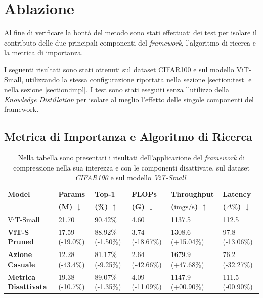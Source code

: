 \section{Ablazione}
Al fine di verificare la bontà del metodo sono stati effettuati dei test per
isolare il contributo delle due principali componenti del \textit{framework},
l'algoritmo di ricerca e la metrica di importanza. \par
I seguenti risultati sono stati ottenuti sul dataset CIFAR100 e sul modello
ViT-Small, utilizzando la stessa configurazione riportata nella sezione
\ref{section:test} e nella sezione \ref{section:impl}. I test sono stati
eseguiti senza l'utilizzo della \textit{Knowledge Distillation} per isolare al
meglio l'effetto delle singole componenti del framework.
\subsection{Metrica di Importanza e Algoritmo di Ricerca}
\begin{table}[H]
    \centering
    \footnotesize
    \setlength{\tabcolsep}{4pt}
    \begin{tabular}{@{} l l l l l l @{}}
        \toprule
        \textbf{Model} & \textbf{Params} & \textbf{Top-1} & \textbf{FLOPs} & \textbf{Throughput} & \textbf{Latency} \\ 
                       & \textbf{(M) $\downarrow$}    & \textbf{(\%) $\uparrow$}  & \textbf{(G) $\downarrow$}   & \textbf{($\text{imgs}/\text{s}$) $\uparrow$} & \textbf{($\Delta\%$) $\downarrow$} \\ 
        \midrule
        ViT-Small                     & 21.70 \hphantom{(-00.0\%)}                 & 90.42\% \hphantom{(-0.00\%)}                 & 4.60 \hphantom{(-00.00\%)}          & 1137.5 \hphantom{(+00.00\%)}            & 112.5 \hphantom{(-00.00\%)}          \\
        \midrule
        \textbf{ViT-S Pruned} & 17.59 (-19.0\%)                            & 88.92\% (-1.50\%)                            & 3.74 (-18.67\%)                     & 1308.6 (+15.04\%)                       & 97.8 (-13.06\%)                      \\
        \midrule
        \textbf{Azione Casuale}  & 12.28 (-43.4\%)                            & 81.17\% (-9.25\%)                            & 2.64 (-42.66\%)                     & 1679.9 (+47.68\%)                       & 76.2 (-32.27\%)                      \\
        \midrule
        \textbf{Metrica Disattivata}  & 19.38 (-10.7\%)                            & 89.07\% (-1.35\%)                            & 4.09 (-11.09\%)                     & 1147.9 (+00.90\%)                       & 111.5 (-00.90\%)                     \\
        \bottomrule
    \end{tabular}
    \vspace{10pt}
    \caption{Nella tabella sono presentati i risultati dell'applicazione del \textit{framework} di compressione nella sua interezza e con le componenti disattivate, sul dataset \textit{CIFAR100} e sul modello \textit{ViT-Small}.}
    \label{tab:risultati-ablazione}
\end{table}

